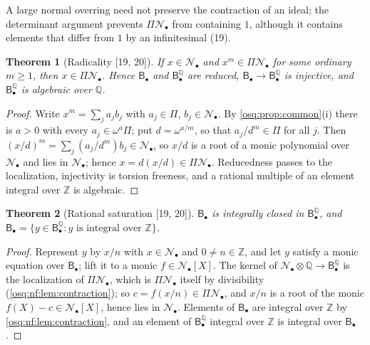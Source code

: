 \documentclass[11pt,letterpaper]{article}
\numberwithin{equation}{section}
\newtheorem{theorem}{Theorem}[section]
\theoremstyle{definition}
\theoremstyle{remark}
\theoremstyle{plain}
\newcommand{\Z}{\mathbb Z}
\newcommand{\Q}{\mathbb Q}
\newcommand{\NN}{\mathcal N}         %
\newcommand{\src}[1]{\textup{\textsf{[#1]}}}
\begin{document}
A large normal overring need not preserve the contraction of an ideal; the determinant argument prevents $\Pi\NN_\bullet$ from
containing $1$, although it contains elements that differ from $1$ by an infinitesimal (19).

\begin{theorem}[Radicality \src{19, 20}]\label{osq:nf:thm:radical}
If $x\in\NN_\bullet$ and $x^m\in\Pi\NN_\bullet$ for some ordinary $m\ge1$, then $x\in\Pi\NN_\bullet$. Hence $\mathsf B_\bullet$ and
$\mathsf B^\Q_\bullet$ are reduced, $\mathsf B_\bullet\to\mathsf B^\Q_\bullet$ is injective, and $\mathsf B^\Q_\bullet$ is algebraic over $\Q$.
\end{theorem}
\begin{proof}
Write $x^m=\sum_ja_jb_j$ with $a_j\in\Pi$, $b_j\in\NN_\bullet$. By \cref{osq:prop:common}(i) there is $a>0$ with every $a_j\in\omega^a\Pi$;
put $d=\omega^{a/m}$, so that $a_j/d^m\in\Pi$ for all $j$. Then $(x/d)^m=\sum_j(a_j/d^m)b_j\in\NN_\bullet$, so
$x/d$ is a root of a monic polynomial over $\NN_\bullet$ and lies in $\NN_\bullet$; hence $x=d(x/d)\in\Pi\NN_\bullet$. Reducedness passes
to the localization, injectivity is torsion freeness, and a rational multiple of an element integral over $\Z$ is algebraic.
\end{proof}

\begin{theorem}[Rational saturation \src{19, 20}]\label{osq:nf:thm:saturation}
$\mathsf B_\bullet$ is integrally closed in $\mathsf B^\Q_\bullet$, and $\mathsf B_\bullet=\{y\in\mathsf B^\Q_\bullet:y\text{ is integral over }\Z\}$.
\end{theorem}
\begin{proof}
Represent $y$ by $x/n$ with $x\in\NN_\bullet$ and $0\ne n\in\Z$, and let $y$ satisfy a monic equation over $\mathsf B_\bullet$; lift it to a
monic $f\in\NN_\bullet[X]$. The kernel of $\NN_\bullet\otimes\Q\to\mathsf B^\Q_\bullet$ is the localization of $\Pi\NN_\bullet$, which is
$\Pi\NN_\bullet$ itself by divisibility (\cref{osq:nf:lem:contraction}); so $c=f(x/n)\in\Pi\NN_\bullet$, and $x/n$ is a root of the monic
$f(X)-c\in\NN_\bullet[X]$, hence lies in $\NN_\bullet$. Elements of $\mathsf B_\bullet$ are integral over $\Z$ by \cref{osq:nf:lem:contraction},
and an element of $\mathsf B^\Q_\bullet$ integral over $\Z$ is integral over $\mathsf B_\bullet$.
\end{proof}
\end{document}
